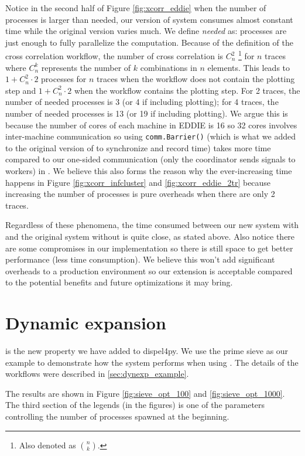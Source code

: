 Notice in the second half of Figure \ref{fig:xcorr_eddie} when the number of processes is larger than needed, our version of system consumes almost constant time while the original version varies much. We define \emph{needed} as: processes are just enough to fully parallelize the computation. Because of the definition of the cross correlation workflow, the number of cross correlation is $C^2_n$ \footnote{Also denoted as $\binom{n}{k}$.} for $n$ traces where $C^k_n$ represents the number of $k$ combinations in $n$ elements. This leads to $1+C^2_n \cdot 2$ processes for $n$ traces when the workflow does not contain the plotting step and $1+C^2_n \cdot 2$ when the workflow contains the plotting step. For 2 traces, the number of needed processes is 3 (or 4 if including plotting); for 4 traces, the number of needed processes is 13 (or 19 if including plotting). We argue this is because the number of cores of each machine in EDDIE is 16 so 32 cores involves inter-machine communication so using \lstinline|comm.Barrier()| (which is what we added to the original version of \dpy to synchronize and record time) takes more time compared to our one-sided communication (only the coordinator sends signals to workers) in \tincdep. We believe this also forms the reason why the ever-increasing time happens in Figure \ref{fig:xcorr_infcluster} and \ref{fig:xcorr_eddie_2tr} because increasing the number of processes is pure overheads when there are only 2 traces.

Regardless of these phenomena, the time consumed between our new system with \tincdep and the original system without \tincdep is quite close, as stated above. Also notice there are some compromises in our implementation so there is still space to get better performance (\ie less time consumption). We believe this won't add significant overheads to a production environment so our extension is acceptable compared to the potential benefits and future optimizations it may bring.

\section{Dynamic expansion}
\tDynexp is the new property we have added to dispel4py. We use the prime sieve as our example to demonstrate how the system performs when using \tdynexp. The details of the workflows were described in \ref{sec:dynexp_example}.

The results are shown in Figure \ref{fig:sieve_opt_100} and \ref{fig:sieve_opt_1000}. The third section of the legends (in the figures) is one of the parameters controlling the number of processes spawned at the beginning.

